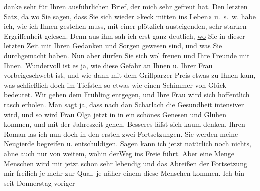\begin{ledgroupsized}[t]{13cm}
           danke sehr für Ihren ausführlichen Brief, der mich sehr gefreut hat. Den letzten
               Satz, da wo Sie sagen, dass Sie sich wieder »keck mitten ins Leben« u. s. w. habe
               ich, wie ich Ihnen gestehen muss, mit einer plötzlich austeigenden, sehr starken
               Ergriffenheit gelesen. Denn aus ihm sah ich erst ganz deutlich, \uline{wo} Sie in dieser letzten Zeit mit Ihren Gedanken und Sorgen gewesen
               sind, und was Sie durchgemacht haben. Nun aber dürfen Sie sich wol freuen und Ihre
               Freunde mit Ihnen. Wundervoll ist es ja, wie diese Gefahr an Ihnen u. Ihrer Frau vorbeigeschwebt ist, und
               wie dann mit dem Grillparzer Preis etwas zu Ihnen
               kam, was schließlich doch im Tiefsten so etwas wie einen Schimmer von Glück bedeutet.
               Wir gehen dem Frühling entgegen, und Ihre Frau wird sich hoffentlich rasch erholen. Man sagt ja, dass
               nach dan Scharlach die Gesundheit intensiver wird, und so wird Frau Olga jetzt in in ein schönes Genesen und Glühen kommen, und
               mit der Jahreszeit gehen. Besseres läſst sich kaum denken. Ihren Roman las ich nun doch in den ersten zwei
               Fortsetzungen. Sie werden meine Neugierde begreifen u. entschuldigen. Sagen kann ich
               jetzt natürlich noch nichts, ahne auch nur von weitem, wohin derWeg ins Freie führt. Aber eine Menge
               Menschen wird mir jetzt schon sehr lebendig und das Abreißen der Fortsetzung mir
               freilich je mehr zur Qual, je näher einem diese Menschen kommen.\pend
           \pstart
           {\pb}Ich bin seit Donnerstag voriger

\end{ledgroupsized}
